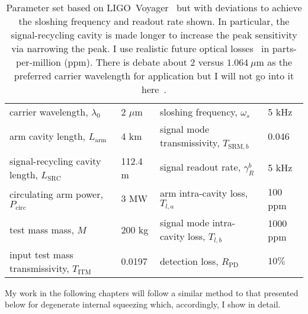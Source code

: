 \begin{table}
\centering
\begin{tabular}{@{}ll|ll@{}}
\toprule
carrier wavelength, $\lambda_0$ & 2 $\mu\text{m}$ & sloshing frequency, $\omega_s$ & 5 kHz \\
arm cavity length, $L_\text{arm}$ & 4 km & signal mode transmissivity, $T_{\text{SRM},b}$ & 0.046 \\
signal-recycling cavity length, $L_\text{SRC}$ & 112.4 m & signal readout rate, $\gamma^b_R$ & 5 kHz \\
circulating arm power, $P_\text{circ}$ & 3 MW & arm intra-cavity loss, $T_{l,a}$ & 100 ppm \\
test mass mass, $M$ & 200 kg & signal mode intra-cavity loss, $T_{l,b}$ & 1000 ppm \\
input test mass transmissivity, $T_\text{ITM}$ & 0.0197 & detection loss, $R_\text{PD}$ & $10\%$ \\ \bottomrule
\end{tabular}
\caption{Parameter set based on LIGO~Voyager~\cite{LIGO_Voyager} but with deviations to achieve the sloshing frequency and readout rate shown. In particular, the signal-recycling cavity is made longer to increase the peak sensitivity via narrowing the peak. I use realistic future optical losses~\cite{zhangBroadbandSignalRecycling2021,Danilishin_2019} in parts-per-million (ppm). There is debate about $2$ versus $1.064~\mu\text{m}$ as the preferred carrier wavelength for application but I will not go into it here~\cite{wills2018gravitational}.}
\label{tab:dIS_parameters}
\end{table}

My work in the following chapters will follow a similar method to that presented below for degenerate internal squeezing which, accordingly, I show in detail.

